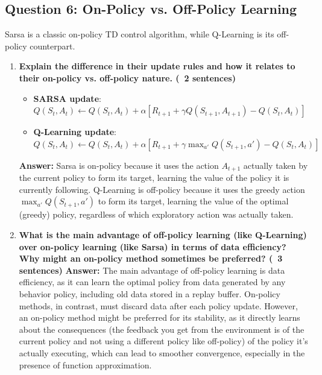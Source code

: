\documentclass[12pt]{article}
\begin{document}
\subsection*{Question 6: On-Policy vs. Off-Policy Learning}
Sarsa is a classic on-policy TD control algorithm, while Q-Learning is its off-policy counterpart.
\begin{enumerate}
    \item \textbf{Explain the difference in their update rules and how it relates to their on-policy vs. off-policy nature. (~2 sentences)}
    
    \begin{itemize}
    \item \textbf{SARSA update}: $Q(S_t, A_t) \leftarrow Q(S_t, A_t) + \alpha [R_{t+1} + \gamma Q(S_{t+1}, A_{t+1}) - Q(S_t, A_t)]$
    \item \textbf{Q-Learning update}: $Q(S_t, A_t) \leftarrow Q(S_t, A_t) + \alpha [R_{t+1} + \gamma \max_{a'} Q(S_{t+1}, a') - Q(S_t, A_t)]$
\end{itemize}

    
    \textbf{Answer:} Sarsa is on-policy because it uses the action $A_{t+1}$ actually taken by the current policy to form its target, learning the value of the policy it is currently following. Q-Learning is off-policy because it uses the greedy action $\max_{a'} Q(S_{t+1}, a')$ to form its target, learning the value of the optimal (greedy) policy, regardless of which exploratory action was actually taken.
    
    \item \textbf{What is the main advantage of off-policy learning (like Q-Learning) over on-policy learning (like Sarsa) in terms of data efficiency? Why might an on-policy method sometimes be preferred? (~3 sentences)}
    \textbf{Answer:} The main advantage of off-policy learning is data efficiency, as it can learn the optimal policy from data generated by any behavior policy, including old data stored in a replay buffer. On-policy methods, in contrast, must discard data after each policy update. However, an on-policy method might be preferred for its stability, as it directly learns about the consequences (the feedback you get from the environment is of the current policy and not using a different policy like off-policy) of the policy it's actually executing, which can lead to smoother convergence, especially in the presence of function approximation.
\end{enumerate}
\end{document}
